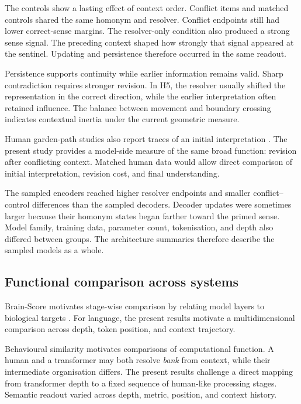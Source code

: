 \documentclass[conference]{IEEEtran}
\begin{document}
The controls show a lasting effect of context order. Conflict items and matched
controls shared the same homonym and resolver. Conflict endpoints still had
lower correct-sense margins. The resolver-only condition also produced a
strong sense signal. The preceding context shaped how strongly that signal
appeared at the sentinel. Updating and persistence therefore occurred in the
same readout.

Persistence supports continuity while earlier information remains valid.
Sharp contradiction requires stronger revision. In H5, the resolver usually
shifted the representation in the correct direction, while the earlier
interpretation often retained influence. The balance between movement and
boundary crossing indicates contextual inertia under the current geometric
measure.

Human garden-path studies also report traces of an initial interpretation
\citep{christianson2001}. The present study provides a model-side measure of
the same broad function: revision after conflicting context. Matched human
data would allow direct comparison of initial interpretation, revision cost,
and final understanding.

The sampled encoders reached higher resolver endpoints and smaller
conflict--control differences than the sampled decoders. Decoder updates were
sometimes larger because their homonym states began farther toward the primed
sense. Model family, training data, parameter count, tokenisation, and depth
also differed between groups. The architecture summaries therefore describe
the sampled models as a whole.

\subsection{Functional comparison across systems}
\label{sec:discussion-functional}

Brain-Score motivates stage-wise comparison by relating model layers to
biological targets \citep{schrimpf2020brainscore}. For language, the present results motivate a
multidimensional comparison across depth, token position, and context
trajectory.

Behavioural similarity motivates comparisons of computational function. A
human and a transformer may both resolve \emph{bank} from context, while their
intermediate organisation differs. The present results challenge a direct
mapping from transformer depth to a fixed sequence of human-like processing
stages. Semantic readout varied across depth, metric, position, and context
history.
\end{document}
